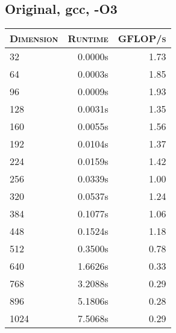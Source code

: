 \begin{table}[!htb]
\begin{minipage}{.5\linewidth}
\subsection{Original, gcc, -O3}
\begin{tabular}{|l|r|r|}
	\hline
	\textsc{Dimension} & \textsc{Runtime} & \textsc{GFLOP/s} \\
	\hline
	\hline
	32  &  0.0000s  & 1.73 \\ 
	\hline 
	64  &  0.0003s  & 1.85 \\ 
	\hline 
	96  &  0.0009s  & 1.93 \\ 
	\hline 
	128  &  0.0031s  & 1.35 \\ 
	\hline 
	160  &  0.0055s  & 1.56 \\ 
	\hline 
	192  &  0.0104s  & 1.37 \\ 
	\hline 
	224  &  0.0159s  & 1.42 \\ 
	\hline 
	256  &  0.0339s  & 1.00 \\ 
	\hline 
	320  &  0.0537s  & 1.24 \\ 
	\hline 
	384  &  0.1077s  & 1.06 \\ 
	\hline 
	448  &  0.1524s  & 1.18 \\ 
	\hline 
	512  &  0.3500s  & 0.78 \\ 
	\hline 
	640  &  1.6626s  & 0.33 \\ 
	\hline 
	768  &  3.2088s  & 0.29 \\ 
	\hline 
	896  & 5.1806s  & 0.28 \\ 
	\hline 
	1024  & 7.5068s  & 0.29 \\ 
	\hline 

\end{tabular}

\end{minipage}%
\end{table}


